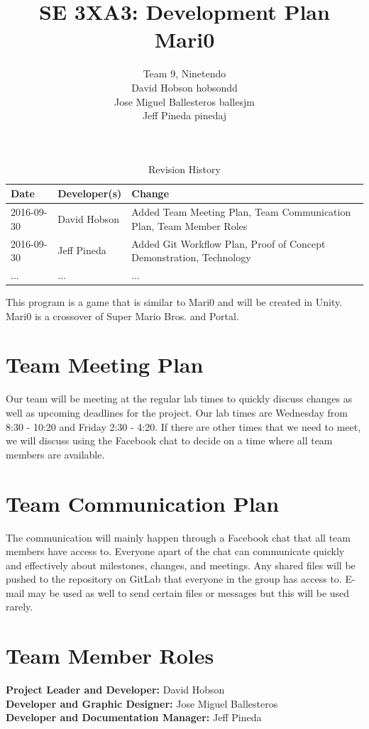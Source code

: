 \documentclass{article}
\title{SE 3XA3: Development Plan\\Mari0}
\author{Team 9, Ninetendo
		\\ David Hobson hobsondd
		\\ Jose Miguel Ballesteros ballesjm
		\\ Jeff Pineda pinedaj
}
\date{}
\begin{document}
\begin{table}[hp]
\caption{Revision History} \label{TblRevisionHistory}
\begin{tabularx}{\textwidth}{llX}
\toprule
\textbf{Date} & \textbf{Developer(s)} & \textbf{Change}\\
\midrule
2016-09-30 & David Hobson & Added Team Meeting Plan, Team Communication Plan, Team Member Roles\\
2016-09-30 & Jeff Pineda & Added Git Workflow Plan, Proof of Concept Demonstration, Technology\\
... & ... & ...\\
\bottomrule
\end{tabularx}
\end{table}

\newpage

\maketitle

This program is a game that is similar to Mari0 and will be created in Unity. Mari0 is a crossover of Super Mario Bros. and Portal.

\section{Team Meeting Plan}
Our team will be meeting at the regular lab times to quickly discuss changes as well as upcoming deadlines for the project. Our lab times are Wednesday from 8:30 - 10:20 and Friday 2:30 - 4:20. If there are other times that we need to meet, we will discuss using the Facebook chat to decide on a time where all team members are available. 

\section{Team Communication Plan}
The communication will mainly happen through a Facebook chat that all team members have access to. Everyone apart of the chat can communicate quickly and effectively about milestones, changes, and meetings. Any shared files will be pushed to the repository on GitLab that everyone in the group has access to. E-mail may be used as well to send certain files or messages but this will be used rarely. 

\section{Team Member Roles}
\textbf{Project Leader and Developer:}  David Hobson\\
\textbf{Developer and Graphic Designer:}  Jose Miguel Ballesteros\\
\textbf{Developer and Documentation Manager:}  Jeff Pineda\\
\end{document}
